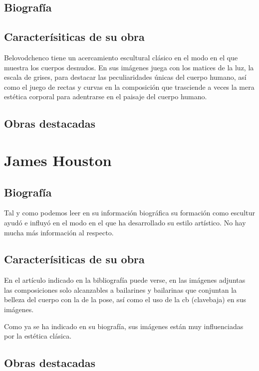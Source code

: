 \subsection{Biograf\'ia}

\subsection{Caracter\'isiticas de su obra}
Belovodchenco tiene un acercamiento escultural cl\'asico\cite{ciantonbelovodchenco} en el modo en el que muestra los cuerpos desnudos. En sus im\'agenes juega con los matices de la luz, la escala de grises, para destacar las peculiaridades \'unicas del cuerpo humano, as\'i como el juego de rectas y curvas en la composici\'on que trasciende a veces la mera est\'etica corporal para adentrarse en el paisaje del cuerpo humano.



\subsection{Obras destacadas}


\section{James Houston}

\subsection{Biograf\'ia}
Tal y como podemos leer en su informaci\'on biogr\'afica\cite{jameshoustonweb} su formaci\'on como escultur ayud\'o e influy\'o en el modo en el que ha desarrollado su estilo art\'istico. No hay mucha m\'as informaci\'on al respecto.

\subsection{Caracter\'isiticas de su obra}

En el art\'iculo indicado en la bibliograf\'ia \cite{cijameshouston} puede verse, en las im\'agenes adjuntas las composiciones solo alcanzables a bailarines y bailarinas que conjuntan la belleza del cuerpo con la de la pose, as\'i como el uso de la \acrshort{cb} (\gls{clavebaja}) en sus im\'agenes.

Como ya se ha indicado en su biograf\'ia, sus im\'agenes est\'an muy influenciadas por la est\'etica cl\'asica.


\subsection{Obras destacadas}



